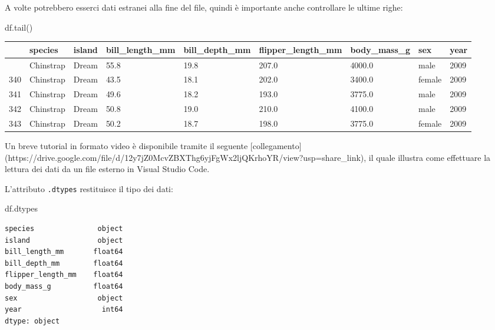 \documentclass[
  letterpaper,
  krantz2]{{[}./krantz{]}}
\newenvironment{Shaded}{\begin{snugshade}}{\end{snugshade}}
\newcommand{\NormalTok}[1]{\textcolor[rgb]{0.00,0.23,0.31}{#1}}
\begin{document}
A volte potrebbero esserci dati estranei alla fine del file, quindi è
importante anche controllare le ultime righe:

\begin{Shaded}
\begin{Highlighting}[]
\NormalTok{df.tail()}
\end{Highlighting}
\end{Shaded}

\begin{longtable}[]{@{}lllllllll@{}}
\toprule\noalign{}
& species & island & bill\_length\_mm & bill\_depth\_mm &
flipper\_length\_mm & body\_mass\_g & sex & year \\
\midrule\noalign{}
\endhead
\bottomrule\noalign{}
\endlastfoot
339 & Chinstrap & Dream & 55.8 & 19.8 & 207.0 & 4000.0 & male & 2009 \\
340 & Chinstrap & Dream & 43.5 & 18.1 & 202.0 & 3400.0 & female &
2009 \\
341 & Chinstrap & Dream & 49.6 & 18.2 & 193.0 & 3775.0 & male & 2009 \\
342 & Chinstrap & Dream & 50.8 & 19.0 & 210.0 & 4100.0 & male & 2009 \\
343 & Chinstrap & Dream & 50.2 & 18.7 & 198.0 & 3775.0 & female &
2009 \\
\end{longtable}

\begin{Shaded}
\begin{Highlighting}[]
\NormalTok{Un breve tutorial in formato video è disponibile tramite il seguente [collegamento](https://drive.google.com/file/d/12y7jZ0McvZBXThg6yjFgWx2ljQKrhoYR/view?usp=share\_link), il quale illustra come effettuare la lettura dei dati da un file esterno in Visual Studio Code. }
\end{Highlighting}
\end{Shaded}

L'attributo \texttt{.dtypes} restituisce il tipo dei dati:

\begin{Shaded}
\begin{Highlighting}[]
\NormalTok{df.dtypes}
\end{Highlighting}
\end{Shaded}

\begin{verbatim}
species               object
island                object
bill_length_mm       float64
bill_depth_mm        float64
flipper_length_mm    float64
body_mass_g          float64
sex                   object
year                   int64
dtype: object
\end{verbatim}
\end{document}
